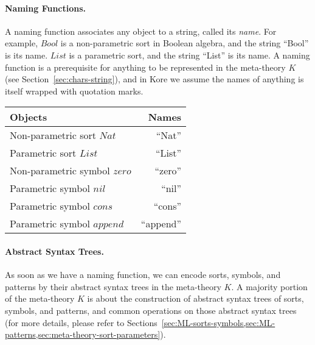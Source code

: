 \documentclass[UTF8,11pt]{article}
\theoremstyle{plain}
\theoremstyle{definition}
\theoremstyle{remark}
\newcommand{\Nat}{\textit{Nat}}
\newcommand{\Bool}{\textit{Bool}}
\newcommand{\List}{\textit{List}}
\newcommand{\nil}{\textit{nil}}
\newcommand{\cons}{\textit{cons}}
\newcommand{\append}{\textit{append}}
\newcommand{\zero}{\textit{zero}}
\begin{document}
\paragraph{Naming Functions.}
A naming function associates any object to a string, called its \emph{name}.
For example, $\Bool$ is a non-parametric sort in Boolean algebra, and the string ``Bool'' is its name.
$\List$ is a parametric sort, and the string ``List'' is its name.
A naming function is a prerequisite for anything to be represented in the meta-theory $K$ (see Section~\cref{sec:chars-string}), and in Kore we assume the names of anything is itself wrapped with quotation marks.

\begin{center}
	\begin{tabular}{l|r}
		\textbf{Objects} & \textbf{Names}
		\\\hline
		Non-parametric sort $\Nat$ & ``Nat''
		\\\hline
		Parametric sort $\List$ & ``List''
		\\\hline
		Non-parametric symbol $\zero$ & ``zero''
		\\\hline
		Parametric symbol $\nil$ & ``nil''
		\\\hline
		Parametric symbol $\cons$ & ``cons''
		\\\hline
		Parametric symbol $\append$ & ``append''
	\end{tabular}
\end{center}

\paragraph{Abstract Syntax Trees.}
As soon as we have a naming function, we can encode sorts, symbols, and 
patterns by their abstract syntax trees in the meta-theory $K$.
A majority portion of the meta-theory $K$ is about the construction of abstract 
syntax trees of sorts, symbols, and patterns, and common operations on those 
abstract syntax trees (for more details, please refer to Sections~\cref{sec:ML-sorts-symbols,sec:ML-patterns,sec:meta-theory-sort-parameters}).
\end{document}
